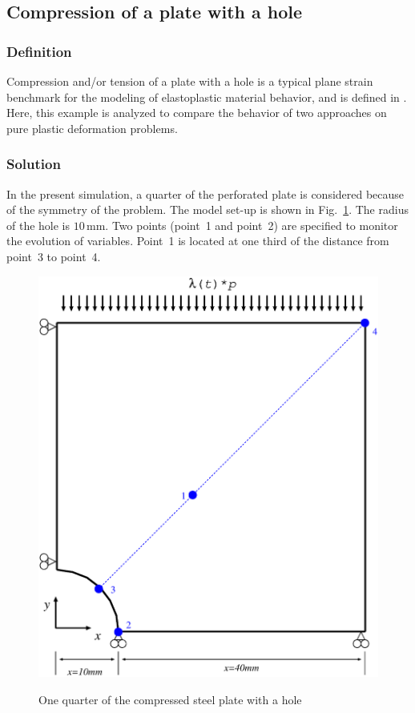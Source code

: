 \subsection{Compression of a plate with a hole}
\label{subsec:Mp1}

\subsubsection{Definition}
\label{subsubsec:Mp1_def}

Compression and/or tension of a plate with a hole is a typical plane strain benchmark for the modeling of elastoplastic material behavior, and is defined in \cite{SteEtAl:03}. Here, this example is analyzed to compare the behavior of two approaches on pure plastic deformation problems. 

\subsubsection{Solution}
\label{subsubsec:Mp1_sol}

In the present simulation, a quarter of the perforated plate is considered because of the symmetry of the problem. The model set-up is shown in Fig.~\ref{Mp_ex1_model}. The radius of the hole is $10\,$mm. Two points (point~1 and point~2) are specified to monitor the evolution of variables. Point~1 is located at one third of the distance from point~3 to point~4.

\begin{figure}[!htb]
\centering
    \includegraphics[scale=0.3]{PART_II/M/ex1_model.eps}\\
   \caption{One quarter of the compressed steel plate with a hole}
  \label{Mp_ex1_model}
\end{figure}

